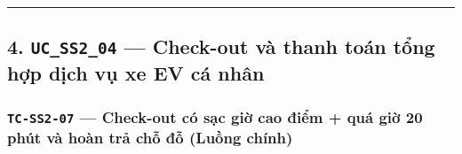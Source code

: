 \documentclass[11pt,a4paper]{article}
\begin{document}
\begin{center}\rule{0.5\linewidth}{0.5pt}\end{center}

\hypertarget{uc_ss2_04-check-out-vuxe0-thanh-touxe1n-tux1ed5ng-hux1ee3p-dux1ecbch-vux1ee5-xe-ev-cuxe1-nhuxe2n}{%
\subsection{\texorpdfstring{4. \texttt{UC\_SS2\_04} --- Check-out và
thanh toán tổng hợp dịch vụ xe EV cá
nhân}{4. UC\_SS2\_04 --- Check-out và thanh toán tổng hợp dịch vụ xe EV cá nhân}}\label{uc_ss2_04-check-out-vuxe0-thanh-touxe1n-tux1ed5ng-hux1ee3p-dux1ecbch-vux1ee5-xe-ev-cuxe1-nhuxe2n}}

\hypertarget{tc-ss2-07-check-out-cuxf3-sux1ea1c-giux1edd-cao-ux111iux1ec3m-quuxe1-giux1edd-20-phuxfat-vuxe0-houxe0n-trux1ea3-chux1ed7-ux111ux1ed7-luux1ed3ng-chuxednh}{%
\subsubsection{\texorpdfstring{\texttt{TC-SS2-07} --- Check-out có sạc
giờ cao điểm + quá giờ 20 phút và hoàn trả chỗ đỗ (Luồng
chính)}{TC-SS2-07 --- Check-out có sạc giờ cao điểm + quá giờ 20 phút và hoàn trả chỗ đỗ (Luồng chính)}}\label{tc-ss2-07-check-out-cuxf3-sux1ea1c-giux1edd-cao-ux111iux1ec3m-quuxe1-giux1edd-20-phuxfat-vuxe0-houxe0n-trux1ea3-chux1ed7-ux111ux1ed7-luux1ed3ng-chuxednh}}
\end{document}
